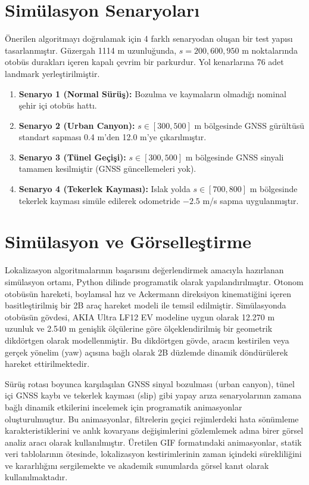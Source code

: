 ﻿\documentclass[conference]{IEEEtran}
\begin{document}
\section{Simülasyon Senaryoları}
Önerilen algoritmayı doğrulamak için 4 farklı senaryodan oluşan bir test yapısı tasarlanmıştır. Güzergah 1114 m uzunluğunda, $s=200, 600, 950$ m noktalarında otobüs durakları içeren kapalı çevrim bir parkurdur. Yol kenarlarına 76 adet landmark yerleştirilmiştir.
\begin{enumerate}
    \item \textbf{Senaryo 1 (Normal Sürüş):} Bozulma ve kaymaların olmadığı nominal şehir içi otobüs hattı.
    \item \textbf{Senaryo 2 (Urban Canyon):} $s \in [300, 500]$ m bölgesinde GNSS gürültüsü standart sapması 0.4 m'den 12.0 m'ye çıkarılmıştır.
    \item \textbf{Senaryo 3 (Tünel Geçişi):} $s \in [300, 500]$ m bölgesinde GNSS sinyali tamamen kesilmiştir (GNSS güncellemeleri yok).
    \item \textbf{Senaryo 4 (Tekerlek Kayması):} Islak yolda $s \in [700, 800]$ m bölgesinde tekerlek kayması simüle edilerek odometride $-2.5$ m/s sapma uygulanmıştır.
\end{enumerate}

\section{Simülasyon ve Görselleştirme}
Lokalizasyon algoritmalarının başarısını değerlendirmek amacıyla hazırlanan simülasyon ortamı, Python dilinde programatik olarak yapılandırılmıştır. Otonom otobüsün hareketi, boylamsal hız ve Ackermann direksiyon kinematiğini içeren basitleştirilmiş bir 2B araç hareket modeli ile temsil edilmiştir. Simülasyonda otobüsün gövdesi, AKIA Ultra LF12 EV modeline uygun olarak 12.270 m uzunluk ve 2.540 m genişlik ölçülerine göre ölçeklendirilmiş bir geometrik dikdörtgen olarak modellenmiştir. Bu dikdörtgen gövde, aracın kestirilen veya gerçek yönelim (yaw) açısına bağlı olarak 2B düzlemde dinamik döndürülerek hareket ettirilmektedir. 

Sürüş rotası boyunca karşılaşılan GNSS sinyal bozulması (urban canyon), tünel içi GNSS kaybı ve tekerlek kayması (slip) gibi yapay arıza senaryolarının zamana bağlı dinamik etkilerini incelemek için programatik animasyonlar oluşturulmuştur. Bu animasyonlar, filtrelerin geçici rejimlerdeki hata sönümleme karakteristiklerini ve anlık kovaryans değişimlerini gözlemlemek adına birer görsel analiz aracı olarak kullanılmıştır. Üretilen GIF formatındaki animasyonlar, statik veri tablolarının ötesinde, lokalizasyon kestirimlerinin zaman içindeki sürekliliğini ve kararlılığını sergilemekte ve akademik sunumlarda görsel kanıt olarak kullanılmaktadır.
\end{document}
